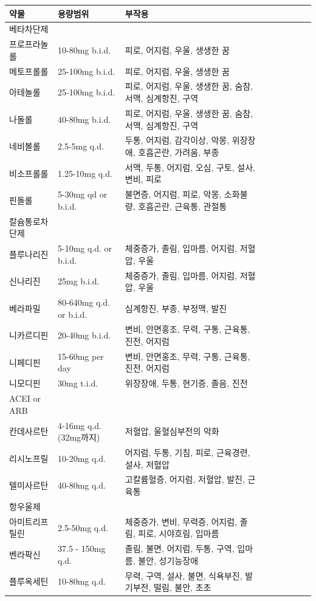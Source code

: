 \documentclass[]{book}
\begin{document}
\begin{longtable}{lllllllll}
\toprule
약물 & 용량범위 & 부작용\\
\midrule
베타차단제 &  & \\
프로프라놀롤 & 10-80mg b.i.d. & 피로, 어지럼, 우울, 생생한 꿈\\
메토프롤롤 & 25-100mg b.i.d. & 피로, 어지럼, 우울, 생생한 꿈\\
아테놀롤 & 25-100mg b.i.d. & 피로, 어지럼, 우울, 생생한 꿈, 숨참, 서맥, 심계항진, 구역\\
나돌롤 & 40-80mg b.i.d. & 피로, 어지럼, 우울, 생생한 꿈, 숨참, 서맥, 심계항진, 구역\\
\addlinespace
네비볼롤 & 2.5-5mg q.d. & 두통, 어지럼, 감각이상, 악몽, 위장장애, 호흡곤란, 가려움, 부종\\
비소프롤롤 & 1.25-10mg q.d. & 서맥, 두통, 어지럼, 오심, 구토, 설사, 변비, 피로\\
핀돌롤 & 5-30mg qd or b.i.d. & 불면증, 어지럼, 피로, 악몽, 소화불량, 호흡곤란, 근육통, 관절통\\
칼슘통로차단제 &  & \\
플루나리진 & 5-10mg q.d. or b.i.d. & 체중증가, 졸림, 입마름, 어지럼, 저혈압, 우울\\
\addlinespace
신나리진 & 25mg b.i.d. & 체중증가, 졸림, 입마름, 어지럼, 저혈압, 우울\\
베라파밀 & 80-640mg q.d. or b.i.d. & 심계항진, 부종, 부정맥, 발진\\
니카르디핀 & 20-40mg b.i.d. & 변비, 안면홍조, 무력, 구통, 근육통, 진전, 어지럼\\
니페디핀 & 15-60mg per day & 변비, 안면홍조, 무력, 구통, 근육통, 진전, 어지럼\\
니모디핀 & 30mg t.i.d. & 위장장애, 두통, 현기증, 졸음, 진전\\
\addlinespace
ACEI or ARB &  & \\
칸데사르탄 & 4-16mg q.d.(32mg까지) & 저혈압, 울혈심부전의 악화\\
리시노프릴 & 10-20mg q.d. & 어지럼, 두통, 기침, 피로, 근육경련, 설사, 저혈압\\
텔미사르탄 & 40-80mg q.d. & 고칼륨혈증, 어지럼, 저혈압, 발진, 근육통\\
항우울제 &  & \\
\addlinespace
아미트리프틸린 & 2.5-50mg q.d. & 체중증가, 변비, 무력증, 어지럼, 졸림, 피로, 시야흐림, 입마름\\
벤라팍신 & 37.5 - 150mg q.d. & 졸림, 불면, 어지럼, 두통, 구역, 입마름, 불안, 성기능장애\\
플루옥세틴 & 10-80mg q.d. & 무력, 구역, 설사, 불면, 식욕부진, 발기부전, 떨림, 불안, 초초\\

\end{longtable}
\end{document}
